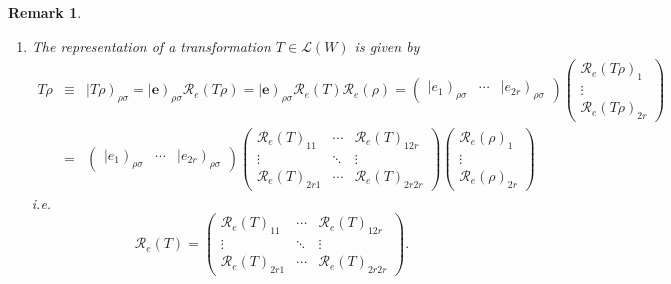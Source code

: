 \documentclass[aps,preprint]{revtex4}
\newtheorem{remark}[theorem]{Remark}
\begin{document}
\begin{remark}
\begin{enumerate}
\item The representation of a transformation $T\in \mathcal{L}\left(
W\right) $ is given by 
\begin{eqnarray}
T\rho &\equiv &\left\vert T\rho \right) _{\rho \sigma }=\left\vert \mathbf{e}%
\right) _{\rho \sigma }\mathcal{R}_{e}\left( T\rho \right) =\left\vert 
\mathbf{e}\right) _{\rho \sigma }\mathcal{R}_{e}\left( T\right) \mathcal{R}%
_{e}\left( \rho \right) =\left( 
\begin{array}{ccc}
\left\vert e_{1}\right) _{\rho \sigma } & \cdots & \left\vert e_{2r}\right)
_{\rho \sigma }%
\end{array}%
\right) \left( 
\begin{array}{c}
\mathcal{R}_{e}\left( T\rho \right) _{1} \\ 
\vdots \\ 
\mathcal{R}_{e}\left( T\rho \right) _{2r}%
\end{array}%
\right) \\
&=&\left( 
\begin{array}{ccc}
\left\vert e_{1}\right) _{\rho \sigma } & \cdots & \left\vert e_{2r}\right)
_{\rho \sigma }%
\end{array}%
\right) \left( 
\begin{array}{ccc}
\mathcal{R}_{e}\left( T\right) _{11} & \cdots & \mathcal{R}_{e}\left(
T\right) _{12r} \\ 
\vdots & \ddots & \vdots \\ 
\mathcal{R}_{e}\left( T\right) _{2r1} & \cdots & \mathcal{R}_{e}\left(
T\right) _{2r2r}%
\end{array}%
\right) \left( 
\begin{array}{c}
\mathcal{R}_{e}\left( \rho \right) _{1} \\ 
\vdots \\ 
\mathcal{R}_{e}\left( \rho \right) _{2r}%
\end{array}%
\right)
\end{eqnarray}%
i.e. 
\begin{equation}
\mathcal{R}_{e}\left( T\right) =\left( 
\begin{array}{ccc}
\mathcal{R}_{e}\left( T\right) _{11} & \cdots & \mathcal{R}_{e}\left(
T\right) _{12r} \\ 
\vdots & \ddots & \vdots \\ 
\mathcal{R}_{e}\left( T\right) _{2r1} & \cdots & \mathcal{R}_{e}\left(
T\right) _{2r2r}%
\end{array}%
\right) .
\end{equation}


\end{enumerate}
\end{remark}
\end{document}
